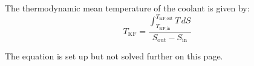 The thermodynamic mean temperature of the coolant is given by:  
\[
T_{\text{KF}} = \frac{\int_{T_{\text{KF,in}}}^{T_{\text{KF,out}}} T \, dS}{S_{\text{out}} - S_{\text{in}}}
\]  

The equation is set up but not solved further on this page.